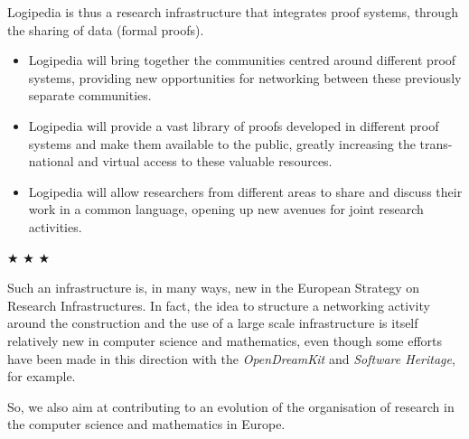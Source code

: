 

Logipedia is thus a research infrastructure that integrates proof
systems, through the sharing of data (formal proofs).

\begin{itemize}
\item Logipedia will bring together the communities centred around
  different proof systems, providing new opportunities for networking
  between these previously separate communities.

\item Logipedia will provide a vast library of proofs developed in
  different proof systems and make them available to the public,
  greatly increasing the trans-national and virtual access to these
  valuable resources.

\item Logipedia will allow researchers from different areas to share
  and discuss their work in a common language, opening up new avenues
  for joint research activities.
\end{itemize}


\begin{center}
$\bigstar$ $\bigstar$ $\bigstar$
\end{center}

\hspace{0.4cm} Such an infrastructure is, in many ways, new in the
European Strategy on Research Infrastructures. In fact, the idea to
structure a networking activity around the construction and the use of
a large scale infrastructure is itself relatively new in computer
science and mathematics, even though some efforts have been made in
this direction with the {\em OpenDreamKit} and {\em Software
  Heritage}, for example.

\hspace{0.4cm} So, we also aim at contributing to an evolution of the
organisation of research in the computer science and mathematics in
Europe.





